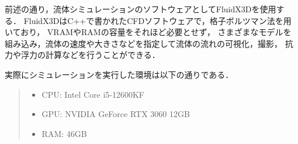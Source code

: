
前述の通り，流体シミュレーションのソフトウェアとしてFluidX3Dを使用する．
FluidX3DはC++で書かれたCFDソフトウェアで，格子ボルツマン法を用いており，
VRAMやRAMの容量をそれほど必要とせず，
さまざまなモデルを組み込み，流体の速度や大きさなどを指定して流体の流れの可視化，撮影，
抗力や浮力の計算などを行うことができる．

実際にシミュレーションを実行した環境は以下の通りである．

\begin{quote}
    \begin{itemize}
        \item CPU: Intel Core i5-12600KF
        \item GPU: NVIDIA GeForce RTX 3060 12GB
        \item RAM: 46GB
    \end{itemize}
\end{quote}